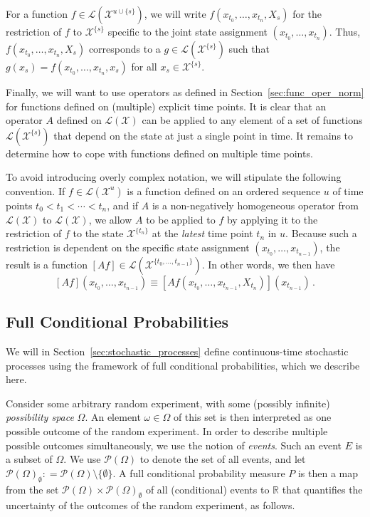 \documentclass[10pt]{paper}
\theoremstyle{definition}
\newcommand{\reals}{\mathbb{R}}
\newcommand{\states}{\mathcal{X}}
\newcommand{\paths}{\Omega}
\newcommand{\power}{\mathcal{P}(\paths)}
\newcommand{\nonemptypower}{\power_{\emptyset}}
\newcommand{\gambles}{\mathcal{L}}
\newcommand{\gamblesX}{\gambles(\states)}
\newcommand{\coloneqq}{:\!=}
\begin{document}
For a function $f\in\gambles(\states^{u\cup\{s\}})$, we will write $f(x_{t_0},\ldots,x_{t_n},X_s)$ for the restriction of $f$ to $\states^{\{s\}}$ specific to the joint state assignment $(x_{t_0},\ldots,x_{t_n})$. Thus, $f(x_{t_0},\ldots,x_{t_n},X_s)$ corresponds to a $g\in\gambles(\states^{\{s\}})$ such that $g(x_s) = f(x_{t_0},\ldots,x_{t_n},x_s)$ for all $x_s\in\states^{\{s\}}$.

Finally, we will want to use operators as defined in Section~\ref{sec:func_oper_norm} for functions defined on (multiple) explicit time points. It is clear that an operator $A$ defined on $\gamblesX$ can be applied to any element of a set of functions $\gambles(\states^{\{s\}})$ that depend on the state at just a single point in time. It remains to determine how to cope with functions defined on multiple time points. 

To avoid introducing overly complex notation, we will stipulate the following convention. If $f\in\gambles(\states^u)$ is a function defined on an ordered sequence $u$ of time points $t_0<t_1<\cdots<t_n$, and if $A$ is a non-negatively homogeneous operator from $\gamblesX$ to $\gamblesX$, we allow $A$ to be applied to $f$ by applying it to the restriction of $f$ to the state $\states^{\{t_n\}}$ at the \emph{latest} time point $t_n$ in $u$. Because such a restriction is dependent on the specific state assignment $(x_{t_0},\ldots,x_{t_{n-1}})$, the result is a function $[Af]\in\gambles(\states^{\{t_0,\ldots,t_{n-1}\}})$. In other words, we then have
\begin{equation*}
\left[Af\right](x_{t_0},\ldots,x_{t_{n-1}}) \equiv \left[A f(x_{t_0},\ldots,x_{t_{n-1}},X_{t_n})\right](x_{t_{n-1}})\,.
\end{equation*}

\subsection{Full Conditional Probabilities}\label{sec:cond_prob}

We will in Section~\ref{sec:stochastic_processes} define continuous-time stochastic processes using the framework of full conditional probabilities, which we describe here. 

Consider some arbitrary random experiment, with some (possibly infinite) \emph{possibility space} $\Omega$. An element $\omega\in\Omega$ of this set is then interpreted as one possible outcome of the random experiment. In order to describe multiple possible outcomes simultaneously, we use the notion of \emph{events}. Such an event $E$ is a subset of $\Omega$. We use $\power$ to denote the set of all events, and let $\nonemptypower\coloneqq\power\setminus\{\emptyset\}$. A full conditional probability measure $P$ is then a map from the set $\power\times\nonemptypower$ of all (conditional) events to $\reals$ that quantifies the uncertainty of the outcomes of the random experiment, as follows.
\end{document}
